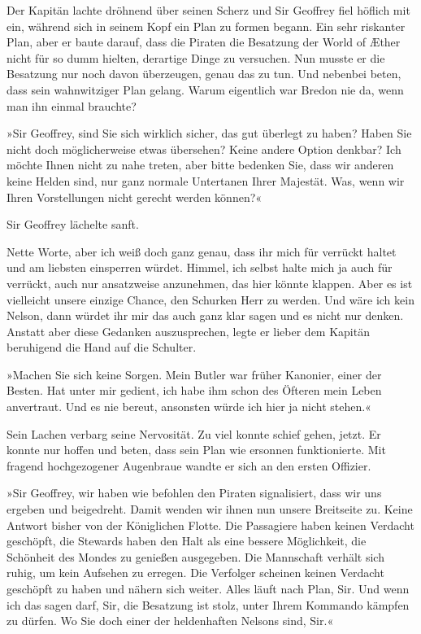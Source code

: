 Der Kapitän lachte dröhnend über seinen Scherz und Sir Geoffrey
fiel höflich mit ein, während sich in seinem Kopf ein Plan zu
formen begann. Ein sehr riskanter Plan, aber er baute darauf, dass
die Piraten die Besatzung der World of Æther nicht für so dumm
hielten, derartige Dinge zu versuchen. Nun musste er die Besatzung
nur noch davon überzeugen, genau das zu tun. Und nebenbei beten,
dass sein wahnwitziger Plan gelang. Warum eigentlich war Bredon nie
da, wenn man ihn einmal brauchte?

\tb

»Sir Geoffrey, sind Sie sich wirklich sicher, das gut überlegt zu
haben? Haben Sie nicht doch möglicherweise etwas übersehen? Keine
andere Option denkbar? Ich möchte Ihnen nicht zu nahe treten, aber
bitte bedenken Sie, dass wir anderen keine Helden sind, nur ganz
normale Untertanen Ihrer Majestät. Was, wenn wir Ihren
Vorstellungen nicht gerecht werden können?«

\bigpar

Sir Geoffrey lächelte sanft.

Nette Worte, aber ich weiß doch ganz genau, dass ihr mich für
verrückt haltet und am liebsten einsperren würdet. Himmel, ich
selbst halte mich ja auch für verrückt, auch nur ansatzweise
anzunehmen, das hier könnte klappen. Aber es ist vielleicht unsere
einzige Chance, den Schurken Herr zu werden. Und wäre ich kein
Nelson, dann würdet ihr mir das auch ganz klar sagen und es nicht
nur denken. Anstatt aber diese Gedanken auszusprechen, legte er
lieber dem Kapitän beruhigend die Hand auf die Schulter.

»Machen Sie sich keine Sorgen. Mein Butler war früher Kanonier,
einer der Besten. Hat unter mir gedient, ich habe ihm schon des
Öfteren mein Leben anvertraut. Und es nie bereut, ansonsten würde
ich hier ja nicht stehen.«

Sein Lachen verbarg seine Nervosität. Zu viel konnte schief gehen,
jetzt. Er konnte nur hoffen und beten, dass sein Plan wie ersonnen
funktionierte. Mit fragend hochgezogener Augenbraue wandte er sich
an den ersten Offizier.

»Sir Geoffrey, wir haben wie befohlen den Piraten signalisiert,
dass wir uns ergeben und beigedreht. Damit wenden wir ihnen nun
unsere Breitseite zu. Keine Antwort bisher von der Königlichen
Flotte. Die Passagiere haben keinen Verdacht geschöpft, die
Stewards haben den Halt als eine bessere Möglichkeit, die Schönheit
des Mondes zu genießen ausgegeben. Die Mannschaft verhält sich
ruhig, um kein Aufsehen zu erregen. Die Verfolger scheinen keinen
Verdacht geschöpft zu haben und nähern sich weiter. Alles läuft
nach Plan, Sir. Und wenn ich das sagen darf, Sir, die Besatzung ist
stolz, unter Ihrem Kommando kämpfen zu dürfen. Wo Sie doch einer
der heldenhaften Nelsons sind, Sir.«

